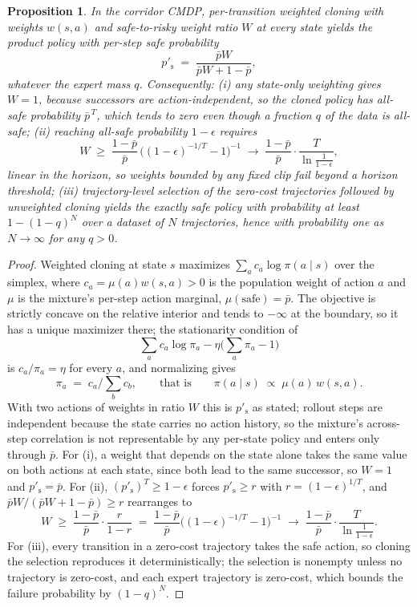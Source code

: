 \documentclass{article} %
\newtheorem{proposition}{Proposition}
\begin{document}
\begin{proposition}
\label{prop:corridor}
In the corridor CMDP, per-transition weighted cloning with weights $w(s, a)$ and safe-to-risky weight ratio $W$ at every state yields the product policy with per-step safe probability
\[
  p'_{\mathrm{s}} \;=\; \frac{\bar p W}{\bar p W + 1 - \bar p},
\]
whatever the expert mass $q$. Consequently: (i) any state-only weighting gives $W = 1$, because successors are action-independent, so the cloned policy has all-safe probability $\bar p^{\,T}$, which tends to zero even though a fraction $q$ of the data is all-safe; (ii) reaching all-safe probability $1 - \epsilon$ requires
\[
  W \;\ge\; \frac{1-\bar p}{\bar p}\,\big((1-\epsilon)^{-1/T} - 1\big)^{-1}
  \;\longrightarrow\; \frac{1-\bar p}{\bar p} \cdot \frac{T}{\ln\frac{1}{1-\epsilon}},
\]
linear in the horizon, so weights bounded by any fixed clip fail beyond a horizon threshold; (iii) trajectory-level selection of the zero-cost trajectories followed by unweighted cloning yields the exactly safe policy with probability at least $1 - (1 - q)^{N}$ over a dataset of $N$ trajectories, hence with probability one as $N \to \infty$ for any $q > 0$.
\end{proposition}

\begin{proof}
Weighted cloning at state $s$ maximizes $\sum_a c_a \log \pi(a \mid s)$ over the
simplex, where $c_a = \mu(a) w(s, a) > 0$ is the population weight of action $a$ and $\mu$ is the mixture's per-step action marginal, $\mu(\text{safe}) = \bar p$. The
objective is strictly concave on the relative interior and tends to $-\infty$ at the
boundary, so it has a unique maximizer there; the stationarity condition of
\[
  \sum_a c_a \log \pi_a - \eta\Big(\sum_a \pi_a - 1\Big)
\]
is $c_a / \pi_a = \eta$ for every $a$, and normalizing gives
\[
  \pi_a \;=\; c_a \Big/ \sum_b c_b,
  \qquad\text{that is}\qquad
  \pi(a \mid s) \;\propto\; \mu(a)\, w(s, a).
\] With two actions of weights in ratio $W$ this is $p'_{\mathrm{s}}$ as
stated; rollout steps are independent because the state carries no action history, so the mixture's across-step correlation is not representable by any per-state policy and enters only through $\bar p$. For (i), a weight that depends on the state alone takes the same value on both actions at each state, since both lead to the same successor, so $W = 1$ and $p'_{\mathrm{s}} = \bar p$. For (ii), $(p'_{\mathrm{s}})^{T} \ge 1 - \epsilon$ forces $p'_{\mathrm{s}} \ge r$ with $r = (1-\epsilon)^{1/T}$, and $\bar p W/(\bar p W + 1 - \bar p) \ge r$ rearranges to
\[
  W \;\ge\; \frac{1-\bar p}{\bar p} \cdot \frac{r}{1-r}
  \;=\; \frac{1-\bar p}{\bar p}\big((1-\epsilon)^{-1/T} - 1\big)^{-1}
  \;\longrightarrow\; \frac{1-\bar p}{\bar p} \cdot \frac{T}{\ln\frac{1}{1-\epsilon}}.
\] For (iii), every transition in a zero-cost trajectory takes the safe action, so cloning the selection reproduces it deterministically; the selection is nonempty unless no trajectory is zero-cost, and each expert trajectory is zero-cost, which bounds the failure probability by $(1-q)^{N}$.
\end{proof}
\end{document}
